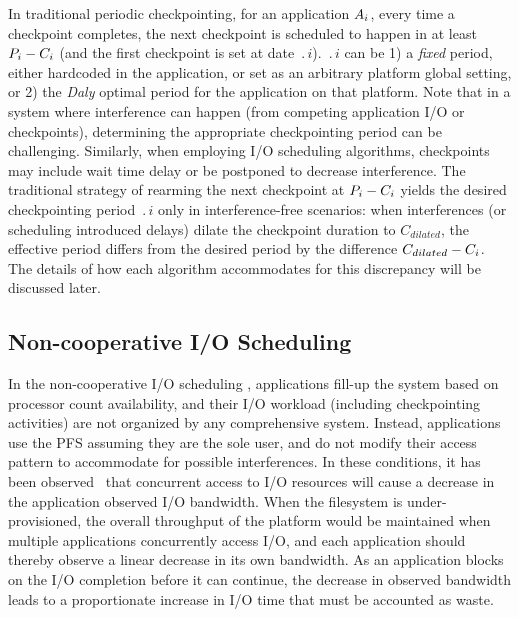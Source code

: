 In traditional periodic checkpointing, for an application $A_{i}$,
every time a checkpoint completes, the next checkpoint is scheduled to
happen in at least $P_{i}-C_{i}$ (and the first checkpoint is
set at date $\period{i}$). $\period{i}$ can be 1) a \emph{fixed} period,
either hardcoded in the application, or set as an arbitrary platform
global setting, or 2) the \emph{Daly} optimal period for the
application on that platform. Note that in a system where interference
can happen (from competing application I/O or checkpoints), determining
the appropriate checkpointing period can be challenging.
Similarly, when employing I/O scheduling algorithms,
checkpoints may include wait time delay or be postponed to decrease
interference. The traditional strategy of rearming the next checkpoint at
$P_{i}-C_{i}$ yields the desired checkpointing period $\period{i}$
only in interference-free scenarios: when interferences (or scheduling
introduced delays) dilate the checkpoint duration to $C_{dilated}$, the effective
period differs from the desired period by the difference $C_{dilated}-C_{i}$.
The details of how each algorithm accommodates for this discrepancy will
be discussed later.


\subsection{Non-cooperative \nocoop I/O Scheduling}

In the non-cooperative I/O scheduling \nocoop, applications
fill-up the system based on processor count availability, and their I/O
workload (including checkpointing activities) are not organized by any
comprehensive system. Instead, applications use the PFS assuming they
are the sole user, and do not modify their access pattern to accommodate
for possible interferences. In these conditions, it has been observed~\cite{Dorier2014}
that concurrent access
to I/O resources will cause a decrease in the application observed
I/O bandwidth.
When the filesystem is under-provisioned, the overall throughput of the platform
would be maintained when multiple applications concurrently access I/O, and each
application should thereby observe a linear decrease in its own bandwidth. As an
application blocks on the I/O completion before it can continue, the decrease in
observed bandwidth leads to a proportionate increase in I/O time that must be
accounted as waste.

